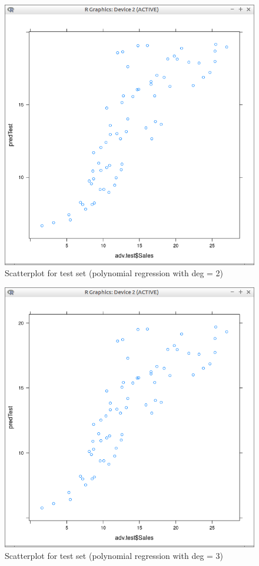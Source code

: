 \documentclass[10pt,a4paper]{article}
\begin{document}
\begin{figure}[H]
\centering
\includegraphics[width=140mm]{figures2/pltTe2.png}
\caption{Scatterplot for test set (polynomial regression with deg = 2) \label{overflow}}
\end{figure}

\begin{figure}[H]
\centering
\includegraphics[width=140mm]{figures2/pltTe3.png}
\caption{Scatterplot for test set (polynomial regression with deg = 3) \label{overflow}}
\end{figure}
\end{document}

